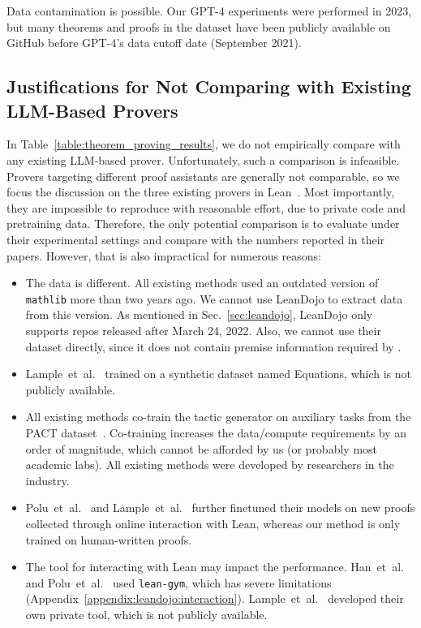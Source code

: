 Data contamination is possible. Our GPT-4 experiments were performed in 2023, but many theorems and proofs in the dataset have been publicly available on GitHub before GPT-4's data cutoff date (September 2021).


\subsection{Justifications for Not Comparing with Existing LLM-Based Provers}
\label{appendix:comparisons}

In Table~\ref{table:theorem_proving_results}, we do not empirically compare {\name} with any existing LLM-based prover. Unfortunately, such a comparison is infeasible. Provers targeting different proof assistants are generally not comparable, so we focus the discussion on the three existing provers in Lean~\cite{han2022proof,polu2023formal,lample2022hypertree}. Most importantly, they are impossible to reproduce with reasonable effort, due to private code and pretraining data. Therefore, the only potential comparison is to evaluate {\name} under their experimental settings and compare with the numbers reported in their papers. However, that is also impractical for numerous reasons:
\begin{itemize}[leftmargin=*]

\item The data is different. All existing methods used an outdated version of \texttt{mathlib} more than two years ago. We cannot use LeanDojo to extract data from this version. As mentioned in Sec.~\ref{sec:leandojo},
LeanDojo only supports repos released after March 24, 2022. Also, we cannot use their dataset directly, since it does not contain premise information required by {\name}.

\item Lample~et~al.~\cite{lample2022hypertree} trained on a synthetic dataset named Equations, which is not publicly available.

\item All existing methods co-train the tactic generator on auxiliary tasks from the PACT dataset~\cite{han2022proof}. Co-training increases the data/compute requirements by an order of magnitude, which cannot be afforded by us (or probably most academic labs). All existing methods were developed by researchers in the industry.

\item Polu~et~al.~\cite{polu2023formal} and Lample~et~al.~\cite{lample2022hypertree} further finetuned their models on new proofs collected through online interaction with Lean, whereas our method is only trained on human-written proofs.

\item The tool for interacting with Lean may impact the performance. Han~et~al.~\cite{han2022proof} and Polu~et~al.~\cite{polu2023formal} used \texttt{lean-gym}, which has severe limitations (Appendix~\ref{appendix:leandojo:interaction}). Lample~et~al.~\cite{lample2022hypertree} developed their own private tool, which is not publicly available.

\end{itemize}


